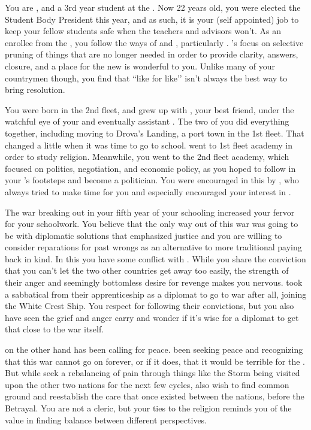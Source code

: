 \documentclass[char]{GL2020}
\begin{document}
\name{\cPresident{}}

You are \cPresident{\intro}, and a 3rd year student at the \pSchool{}. Now 22 years old, you were elected the Student Body President this year, and as such, it is your (self appointed) job to keep your fellow students safe when the teachers and advisors won't. As an enrollee from the \pShip{}, you follow the ways of \cEbb{\full} and \cFlow{\full}, particularly \cEbb{}. \cEbb{}'s focus on selective pruning of things that are no longer needed in order to provide clarity, answers, closure, and a place for the new is wonderful to you. Unlike many of your countrymen though, you find that ``like for like’’ isn’t always the best way to bring resolution.

You were born in the 2nd fleet, and grew up with \cInitiate{\full}, your best friend, under the watchful eye of your \cHeadDiplomat{\Auncle} \cHeadDiplomat{\full} and eventually \cHeadDiplomat{\their} assistant \cJuniorStatesman{\full}. The two of you did everything together, including moving to Drova's Landing, a port town in the 1st fleet. That changed a little when it was time to go to school. \cInitiate{\They} went to 1st fleet academy in order to study religion. Meanwhile, you went to the 2nd fleet academy, which focused on politics, negotiation, and economic policy, as you hoped to follow in your \cHeadDiplomat{\auncle}'s footsteps and become a politician. You were encouraged in this by \cJuniorStatesman{}, who always tried to make time for you and especially encouraged your interest in \cEbb{}. 

The war breaking out in your fifth year of your schooling increased your fervor for your schoolwork. You believe that the only way out of this war was going to be with diplomatic solutions that emphasized justice and you are willing to consider reparations for past wrongs as an alternative to more traditional paying back in kind. In this you have some conflict with \cJuniorStatesman{}. While you share the conviction that you can’t let the two other countries get away too easily, the strength of their anger and seemingly bottomless desire for revenge makes you nervous. \cJuniorStatesman{} took a sabbatical from their apprenticeship as a diplomat to go to war after all, joining the White Crest Ship. You respect \cJuniorStatesman{\them} for following their convictions, but you also have seen the grief and anger \cJuniorStatesman{\they} carry and wonder if it's wise for a diplomat to get that close to the war itself.  

\cHeadDiplomat{} on the other hand has been calling for peace. \cHeadDiplomat{\Theyhave} been seeking peace and recognizing that this war cannot go on forever, or if it does, that it would be terrible for the \pShippies{}. But while \cHeadDiplomat{\they} seek\cHeadDiplomat{\verbs} a rebalancing of pain through things like the Storm being visited upon the other two nations for the next few cycles, \cHeadDiplomat{\they} also wish\cHeadDiplomat{\verbes} to find common ground and reestablish the care that once existed between the nations, before the Betrayal. You are not a cleric, but your ties to the \pShippie{} religion reminds you of the value in finding balance between different perspectives. 
\end{document}
